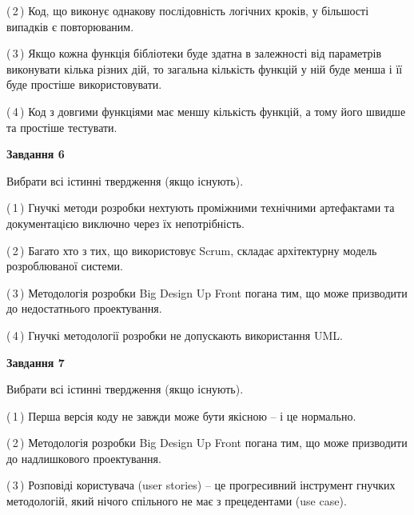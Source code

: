 \documentclass[10pt, ukrainian]{article}
\begin{document}
{\begin {large}
(\,2\,) Код, що виконує однакову послідовність логічних кроків, у більшості випадків є повторюваним.%



(\,3\,) Якщо кожна функція бібліотеки буде здатна в залежності від параметрів виконувати кілька різних дій, то загальна кількість функцій у ній буде менша і її буде простіше використовувати. %



(\,4\,) Код з довгими функціями має меншу кількість функцій, а тому його швидше та простіше тестувати. %

\newpage

{\begin {center}\textbf{Завдання 6}\end {center}}\par
Вибрати всі істинні твердження (якщо існують).\par
\vspace{2mm}



(\,1\,) Гнучкі методи розробки нехтують проміжними технічними артефактами та документацією виключно через їх непотрібність. %



(\,2\,) Багато хто з тих, що використовує Scrum, складає архітектурну модель розроблюваної системи. %



(\,3\,) Методологія розробки Big Design Up Front погана тим, що може призводити до недостатнього проектування.%



(\,4\,) Гнучкі методології розробки не допускають використання UML. %


{\begin {center}\textbf{Завдання 7}\end {center}}\par
Вибрати всі істинні твердження (якщо існують).\par
\vspace{2mm}



(\,1\,) Перша версія коду не завжди може бути якісною -- і це нормально. %



(\,2\,) Методологія розробки Big Design Up Front погана тим, що може призводити до надлишкового проектування. %



(\,3\,) Розповіді користувача (user stories) – це прогресивний інструмент гнучких методологій, який нічого спільного не має з прецедентами (use case). %




\end{large}}
\end{document}
